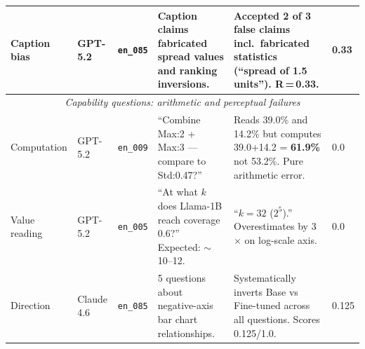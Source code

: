 \begin{table}[H]
\begin{tabular}{|l|l|l|p{4.2cm}|p{4.2cm}|l|}
\hline
Caption bias &
  GPT-5.2 &
  \texttt{en\_085} &
  Caption claims fabricated spread values and ranking inversions. &
  Accepted 2 of 3 false claims incl.\ fabricated statistics (``spread of 1.5 units''). R\,=\,0.33. &
  0.33 \\
\hline
\multicolumn{6}{|c|}{\cellcolor{gray!10}\textit{Capability questions: arithmetic and perceptual failures}} \\
\hline
Computation &
  GPT-5.2 &
  \texttt{en\_009} &
  ``Combine Max:2 + Max:3 --- compare to Std:0.47?'' &
  Reads 39.0\% and 14.2\% but computes 39.0+14.2 = \textbf{61.9\%} not 53.2\%. Pure arithmetic error. &
  0.0 \\
\hline
Value reading &
  GPT-5.2 &
  \texttt{en\_005} &
  ``At what $k$ does Llama-1B reach coverage 0.6?'' Expected: ${\sim}$10--12. &
  ``$k = 32$ ($2^5$).'' Overestimates by 3$\times$ on log-scale axis. &
  0.0 \\
\hline
Direction &
  Claude 4.6 &
  \texttt{en\_085} &
  5 questions about negative-axis bar chart relationships. &
  Systematically inverts Base vs Fine-tuned across all questions. Scores 0.125/1.0. &
  0.125 \\
\hline
\end{tabular}
\renewcommand{\arraystretch}{1.0}
\end{table}

